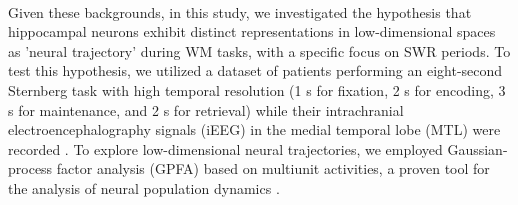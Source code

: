 \documentclass[final,3p,times,twocolumn]{elsarticle}
\begin{document}
\\
\indent
Given these backgrounds, in this study, we investigated the hypothesis that hippocampal neurons exhibit distinct representations in low-dimensional spaces as 'neural trajectory' during WM tasks, with a specific focus on SWR periods. To test this hypothesis, we utilized a dataset of patients performing an eight-second Sternberg task with high temporal resolution (1 s for fixation, 2 s for encoding, 3 s for maintenance, and 2 s for retrieval) while their intrachranial electroencephalography signals (iEEG) in the medial temporal lobe (MTL) were recorded \cite{boran_dataset_2020}. To explore low-dimensional neural trajectories, we employed Gaussian-process factor analysis (GPFA) based on multiunit activities, a proven tool for the analysis of neural population dynamics \cite{yu_gaussian-process_2009}.
\label{sec:introduction}
\end{document}
